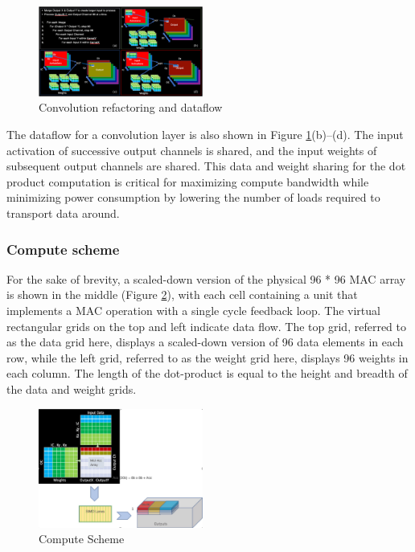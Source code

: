 \documentclass[letterpaper, 10 pt, conference]{ieeeconf}  %
\begin{document}
\begin{figure}[hbt!]
\centering
\includegraphics[width=0.48\textwidth]{gfx/refactoring_dataflow.png}
\caption{Convolution refactoring and dataflow}
\label{refactoring_dataflow}
\end{figure}

The dataflow for a convolution layer is also shown in Figure \ref{refactoring_dataflow}(b)–(d). The input activation of successive output channels is shared, and the input weights of subsequent output channels are shared. This data and weight sharing for the dot product computation is critical for maximizing compute bandwidth while minimizing power consumption by lowering the number of loads required to transport data around\cite{fsd_computer}.

\subsubsection{Compute scheme}

For the sake of brevity, a scaled-down version of the physical 96 * 96 MAC array is shown in the middle (Figure \ref{compute_scheme}), with each cell containing a unit that implements a MAC operation with a single cycle feedback loop. The virtual rectangular grids on the top and left indicate data flow. The top grid, referred to as the data grid here, displays a scaled-down version of 96 data elements in each row, while the left grid, referred to as the weight grid here, displays 96 weights in each column. The length of the dot-product is equal to the height and breadth of the data and weight grids.

\begin{figure}[hbt!]
\centering
\includegraphics[width=0.48\textwidth]{gfx/Compute_scheme.png}
\caption{Compute Scheme}
\label{compute_scheme}
\end{figure}
\end{document}
